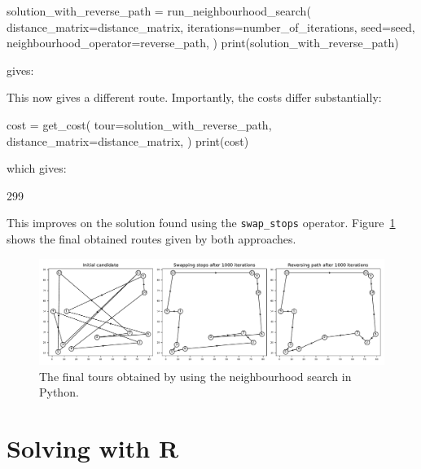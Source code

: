 \begin{pyin}
solution_with_reverse_path = run_neighbourhood_search(
    distance_matrix=distance_matrix,
    iterations=number_of_iterations,
    seed=seed,
    neighbourhood_operator=reverse_path,
)
print(solution_with_reverse_path)
\end{pyin}

gives:

\begin{pyout}
[0, 8, 5, 3, 1, 9, 12, 11, 4, 10, 6, 2, 7, 0]
\end{pyout}

This now gives a different route.
Importantly, the costs differ substantially:

\begin{pyin}
cost = get_cost(
    tour=solution_with_reverse_path,
    distance_matrix=distance_matrix,
)
print(cost)
\end{pyin}

which gives:

\begin{pyout}
299
\end{pyout}

This improves on the solution found using the \texttt{swap_stops}
operator. Figure~\ref{fig:final-tsp-tours-python} shows the final obtained
routes given by both approaches.

\begin{figure}
    \begin{center}
        \includegraphics[width=\textwidth]{./assets/final-tsp-tours-with-python/main.pdf}
    \end{center}
    \caption{The final tours obtained by using the neighbourhood search in
    Python.}
    \label{fig:final-tsp-tours-python}
\end{figure}



\section{Solving with R}\label{sec:heuristics_solving-with-R}


